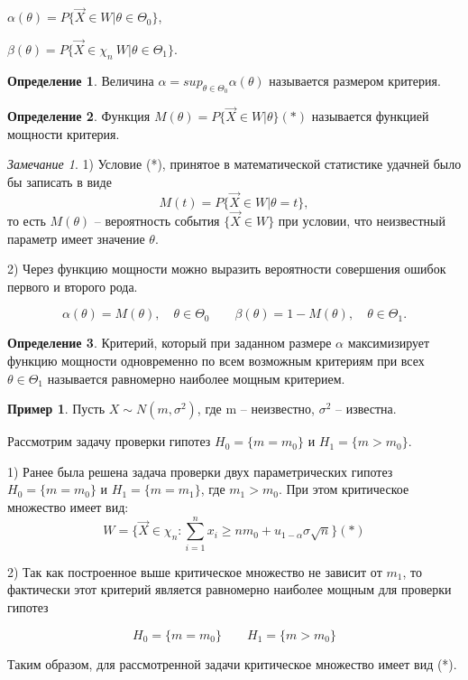 \documentclass[a4paper, 12pt]{article}
\theoremstyle{definition}
\newtheorem{definition}{Определение}[section]
\theoremstyle{leads}
\theoremstyle{example}
\newtheorem{example}{Пример}
\theoremstyle{remark}
\newtheorem{remark}{Замечание}
\begin{document}
 $\alpha(\theta) = P\{\vec{X} \in W | \theta \in \Theta_0\}$, 

$\beta(\theta) = P\{\vec{X} \in \chi_n \ W | \theta \in \Theta_1\}$.

\begin{definition}
	Величина $\alpha = sup_{\theta \in \Theta_0} \alpha(\theta)$ называется размером критерия.
\end{definition}

\begin{definition}
	Функция $M(\theta) = P\{\vec{X} \in W | \theta\} (*)$ называется функцией мощности критерия.
\end{definition}

\begin{remark}
	1) Условие (*), принятое в математической статистике удачней было бы записать в виде 
	\begin{equation*}
		M(t) = P\{\vec{X} \in W | \theta = t\},
	\end{equation*}
	то есть $M(\theta)$ -- вероятность события $\{\vec{X} \in W \}$ при условии, что неизвестный параметр имеет значение $\theta$.
	
	2) Через функцию мощности можно выразить вероятности совершения ошибок первого и второго рода.
	
	\begin{equation*}
		\alpha(\theta) = M(\theta), \quad \theta \in \Theta_0
		\qquad
		\beta(\theta) = 1 - M(\theta), \quad \theta \in \Theta_1.
	\end{equation*}
\end{remark}

\begin{definition}
	Критерий, который при заданном размере $\alpha$ максимизирует функцию мощности одновременно по всем возможным критериям при всех $\theta \in \Theta_1$ называется равномерно наиболее мощным критерием.
\end{definition}

\begin{example}
	Пусть $X \sim N(m, \sigma^2)$, где m -- неизвестно, $\sigma^2$ --  известна.
	
	Рассмотрим задачу проверки гипотез $H_0 = \{m = m_0\}$ и $H_1 = \{m > m_0\}$.
	
	1) Ранее была решена задача проверки двух параметрических гипотез $H_0 = \{m = m_0\}$ и $H_1 = \{m = m_1\}$, где $m_1 > m_0$. При этом критическое множество имеет вид: 
	\begin{equation*}
		W = \{\vec{X} \in \chi_n: \sum_{i=1}^{n}x_i \geq nm_0 + u_{1 - \alpha} \sigma \sqrt{n}\} (*)
	\end{equation*}
	
	2) Так как построенное выше критическое множество не зависит от $m_1$, то фактически этот критерий является равномерно наиболее мощным для проверки гипотез
	
	\begin{equation*}
		H_0 = \{m = m_0\} \qquad H_1 = \{m > m_0\}
	\end{equation*}
	
	Таким образом, для рассмотренной задачи критическое множество имеет вид (*).
\end{example}
\end{document}
